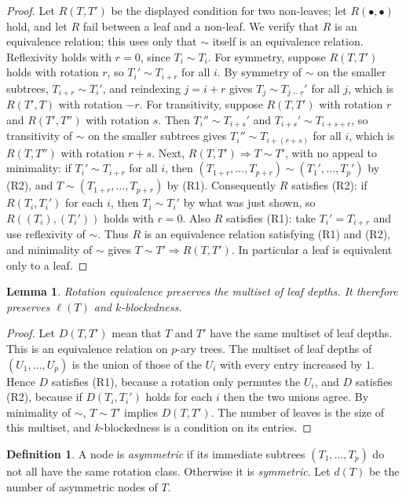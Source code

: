 \documentclass[11pt]{article}
\newtheorem{lemma}[theorem]{Lemma}
\theoremstyle{definition}
\newtheorem{definition}[theorem]{Definition}
\theoremstyle{remark}
\numberwithin{equation}{section}
\numberwithin{figure}{section}
\begin{document}
\begin{proof}
Let $R(T,T')$ be the displayed condition for two non-leaves; let $R(\bullet,\bullet)$ hold, and let $R$ fail between a leaf and a non-leaf.  We verify that $R$ is an equivalence relation; this uses only that $\sim$ itself is an equivalence relation.
Reflexivity holds with $r=0$, since $T_i\sim T_i$.
For symmetry, suppose $R(T,T')$ holds with rotation $r$, so $T_i'\sim T_{i+r}$ for all $i$.  By symmetry of $\sim$ on the smaller subtrees, $T_{i+r}\sim T_i'$, and reindexing $j=i+r$ gives $T_j\sim T_{j-r}'$ for all $j$, which is $R(T',T)$ with rotation $-r$.
For transitivity, suppose $R(T,T')$ with rotation $r$ and $R(T',T'')$ with rotation $s$.  Then $T_i''\sim T_{i+s}'$ and $T_{i+s}'\sim T_{i+s+r}$, so transitivity of $\sim$ on the smaller subtrees gives $T_i''\sim T_{i+(r+s)}$ for all $i$, which is $R(T,T'')$ with rotation $r+s$.
Next, $R(T,T')\Rightarrow T\sim T'$, with no appeal to minimality: if $T_i'\sim T_{i+r}$ for all $i$, then $(T_{1+r},\ldots,T_{p+r})\sim(T_1',\ldots,T_p')$ by (R2), and $T\sim(T_{1+r},\ldots,T_{p+r})$ by (R1).  Consequently $R$ satisfies (R2): if $R(T_i,T_i')$ for each $i$, then $T_i\sim T_i'$ by what was just shown, so $R((T_i),(T_i'))$ holds with $r=0$.  Also $R$ satisfies (R1): take $T_i'=T_{i+r}$ and use reflexivity of $\sim$.  Thus $R$ is an equivalence relation satisfying (R1) and (R2), and minimality of $\sim$ gives $T\sim T'\Rightarrow R(T,T')$.  In particular a leaf is equivalent only to a leaf.
\end{proof}
\begin{lemma}\label{main:lem:depth-invariant}
Rotation equivalence preserves the multiset of leaf depths.  It therefore preserves $\ell(T)$ and $k$-blockedness.
\end{lemma}
\begin{proof}
Let $D(T,T')$ mean that $T$ and $T'$ have the same multiset of leaf depths.  This is an equivalence relation on $p$-ary trees.  The multiset of leaf depths of $(U_1,\ldots,U_p)$ is the union of those of the $U_i$ with every entry increased by $1$.  Hence $D$ satisfies (R1), because a rotation only permutes the $U_i$, and $D$ satisfies (R2), because if $D(T_i,T_i')$ holds for each $i$ then the two unions agree.  By minimality of $\sim$, $T\sim T'$ implies $D(T,T')$.  The number of leaves is the size of this multiset, and $k$-blockedness is a condition on its entries.
\end{proof}
\begin{definition}
A node is \emph{asymmetric} if its immediate subtrees $(T_1,\ldots,T_p)$ do not all have the same rotation class.  Otherwise it is \emph{symmetric}.  Let $d(T)$ be the number of asymmetric nodes of $T$.
\end{definition}
\end{document}

